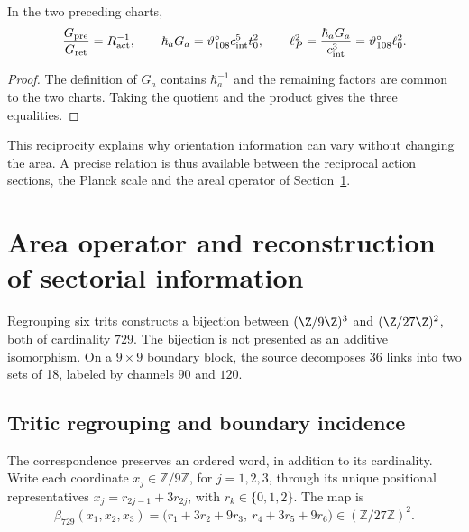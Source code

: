 \begin{proposition}
In the two preceding charts,
\[
\frac{G_{\rm pre}}{G_{\rm ret}}=R_{\rm act}^{-1},\qquad
\hbar_aG_a=\vartheta^\circ_{108}c_{\rm int}^5t_0^2,
\qquad
\ell_P^2=\frac{\hbar_aG_a}{c_{\rm int}^3}
=\vartheta^\circ_{108}\ell_0^2.
\]
\end{proposition}
\begin{proof}
The definition of $G_a$ contains $\hbar_a^{-1}$ and the remaining factors
are common to the two charts. Taking the quotient and the product gives
the three equalities.
\end{proof}
This reciprocity explains why orientation information can
vary without changing the area. A precise relation is thus available
between the reciprocal action sections, the Planck scale and the areal operator
of Section~\ref{x_reciprocidad:v:ant:sec:area}.



\chapter{Area operator and reconstruction of sectorial information}
\label{x_reciprocidad:v:ant:sec:area}
Regrouping six trits constructs a bijection between
$(\Z/9\Z)^3$ and $(\Z/27\Z)^2$, both of cardinality $729$.
The bijection is not presented as an additive isomorphism. On a
$9\times9$ boundary block, the source decomposes 36 links into two
sets of 18, labeled by channels $90$ and $120$.

\section{Tritic regrouping and boundary incidence}
\label{x_reciprocidad:v:ant:sec:ii-area-incidencia-explicita}

The correspondence preserves an ordered word, in addition to its cardinality.
Write each coordinate \(x_j\in\mathbb Z/9\mathbb Z\), for
\(j=1,2,3\), through its unique positional representatives
\(x_j=r_{2j-1}+3r_{2j}\), with \(r_k\in\{0,1,2\}\). The map is
\begin{equation}
 \beta_{729}(x_1,x_2,x_3)
 =\bigl(r_1+3r_2+9r_3,\ r_4+3r_5+9r_6\bigr)
 \in(\mathbb Z/27\mathbb Z)^2.
 \label{x_reciprocidad:v:ant:eq:ii-area-beta729}
\end{equation}

